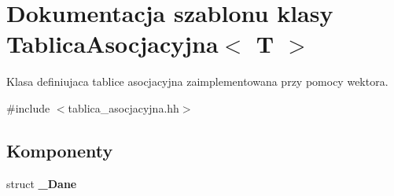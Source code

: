 \hypertarget{class_tablica_asocjacyjna}{\section{\-Dokumentacja szablonu klasy \-Tablica\-Asocjacyjna$<$ \-T $>$}
\label{class_tablica_asocjacyjna}
}


\-Klasa definiujaca tablice asocjacyjna zaimplementowana przy pomocy wektora.  




{\ttfamily \#include $<$tablica\-\_\-asocjacyjna.\-hh$>$}

\subsection*{\-Komponenty}
\begin{DoxyCompactItemize}
\item 
struct {\bfseries \-\_\-\-Dane}
\end{DoxyCompactItemize}
